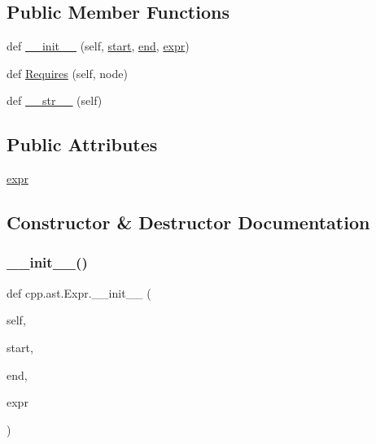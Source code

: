 \subsection*{Public Member Functions}
\begin{DoxyCompactItemize}
\item 
def \hyperlink{classcpp_1_1ast_1_1_expr_adc83f4b17d6e28a39781678692eb25aa}{\+\_\+\+\_\+init\+\_\+\+\_\+} (self, \hyperlink{classcpp_1_1ast_1_1_node_a7b2aa97e6a049bb1a93aea48c48f1f44}{start}, \hyperlink{classcpp_1_1ast_1_1_node_a3c5e5246ccf619df28eca02e29d69647}{end}, \hyperlink{classcpp_1_1ast_1_1_expr_a2f4e13fb0176f2616f8703103c806462}{expr})
\item 
def \hyperlink{classcpp_1_1ast_1_1_expr_a9c92416eb1285068f190dcda8fd33682}{Requires} (self, node)
\item 
def \hyperlink{classcpp_1_1ast_1_1_expr_a7ee1896fbfa7819adbd0b2f89d11ecec}{\+\_\+\+\_\+str\+\_\+\+\_\+} (self)
\end{DoxyCompactItemize}
\subsection*{Public Attributes}
\begin{DoxyCompactItemize}
\item 
\hyperlink{classcpp_1_1ast_1_1_expr_a2f4e13fb0176f2616f8703103c806462}{expr}
\end{DoxyCompactItemize}


\subsection{Constructor \& Destructor Documentation}
\mbox{\label{classcpp_1_1ast_1_1_expr_adc83f4b17d6e28a39781678692eb25aa}} 
\subsubsection{\texorpdfstring{\+\_\+\+\_\+init\+\_\+\+\_\+()}{\_\_init\_\_()}}
{\footnotesize\ttfamily def cpp.\+ast.\+Expr.\+\_\+\+\_\+init\+\_\+\+\_\+ (\begin{DoxyParamCaption}\item[{}]{self,  }\item[{}]{start,  }\item[{}]{end,  }\item[{}]{expr }\end{DoxyParamCaption})}



